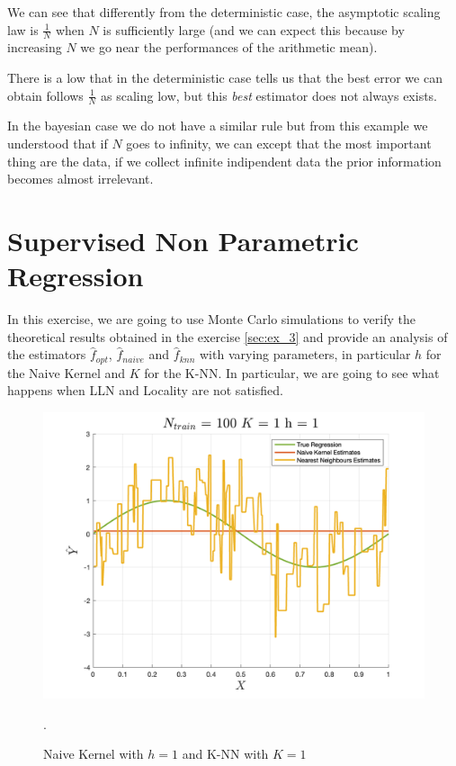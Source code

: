 We can see that differently from the deterministic case, the asymptotic scaling law is $\frac{1}{N}$ when $N$ is sufficiently large (and we can expect this because by increasing $N$ we go near the performances of the arithmetic mean).

There is a low that in the deterministic case tells us that the best error we can obtain follows $\frac{1}{N}$ as scaling low, but this \textit{best} estimator does not always exists.

In the bayesian case we do not have a similar rule but from this example we understood that if $N$ goes to infinity, we can except that the most important thing are the data, if we collect infinite indipendent data the prior information becomes almost irrelevant.

\section{Supervised Non Parametric Regression}

In this exercise, we are going to use Monte Carlo simulations to verify the theoretical results obtained in the exercise \ref{sec:ex_3} and provide an analysis of the estimators $\hat f_{opt}$, $\hat f_{naive}$ and $\hat f_{knn}$ with varying parameters, in particular $h$ for the Naive Kernel and $K$ for the K-NN. In particular, we are going to see what happens when LLN and Locality are not satisfied.

\begin{figure}[H]
    \centering
    \includegraphics[width=\textwidth]{./figures/appendix_a/figure_15.png}
    \caption{Naive Kernel with $h=1$ and K-NN with $K=1$}.
    \label{fig:non_parametric_regression}
\end{figure}

